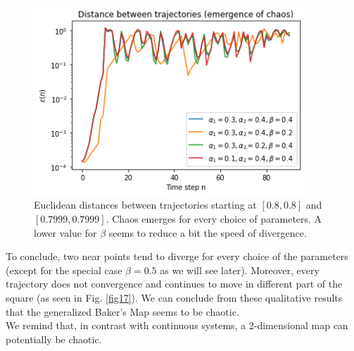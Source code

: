 \documentclass[11pt,titlepage]{article}
\begin{document}
\begin{center}
	\begin{figure} [h]
		\centering
		\includegraphics[width = 4in]{./figures/ex3_1_3.png}
		\caption{Euclidean distances between trajectories starting at $[0.8,0.8]$ and $[0.7999, 0.7999]$. Chaos emerges for every choice of parameters. A lower value for $\beta$ seems to reduce a bit the speed of divergence.}
		\label{fig18}
	\end{figure}
\end{center}
To conclude, two near points tend to diverge for every choice of the parameters (except for the special case $\beta=0.5$ as we will see later). Moreover, every trajectory does not convergence and continues to move in different part of the square (as seen in Fig. \ref{fig17}). We can conclude from these qualitative results that the generalized Baker's Map seems to be chaotic. \\
We remind that, in contrast with continuous systems, a 2-dimensional map can potentially be chaotic.
\end{document}

